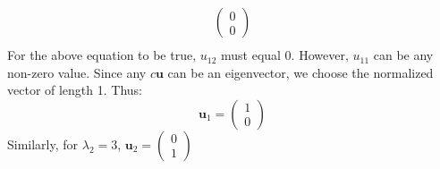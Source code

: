 \documentclass[11pt,twoside]{article}
\newcommand{\?}{\stackrel{?}{=}}
\newcommand{\bl}{\color{blue}}
\newcommand{\la}{\lambda}
\newenvironment{solution}{\begin{adjustwidth}{.05\textwidth}{}\bl}{\medskip\end{adjustwidth}}
\begin{document}
\begin{solution}
\begin{align*}
\begin{pmatrix}
                                         0 \\ 0 
                                       \end{pmatrix}\\
  \end{align*}
  For the above equation to be true, $u_{12}$ must equal 0. However, $u_{11}$ can be any non-zero value.
  Since any $c\bm u$ can be an eigenvector, we choose the normalized vector of length 1. Thus:
  \begin{equation*}
    \bm u_{1} =
    \begin{pmatrix}
      1 \\ 0
    \end{pmatrix}
  \end{equation*}
  Similarly, for $\la_{2} = 3$, $\bm u_{2} =
  \begin{pmatrix}
    0 \\ 1
  \end{pmatrix}
$
\end{solution}
\end{document}
